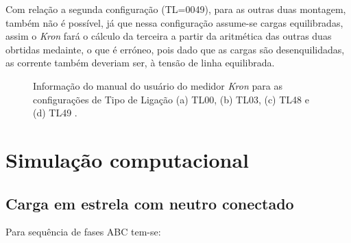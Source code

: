 \documentclass[a4paper,12pt,oneside,openany,table,xcdraw]{article}
\begin{document}
Com relação a segunda configuração (TL=0049), para as outras duas montagem, também não é possível, já que nessa configuração assume-se cargas equilibradas, assim o \emph{Kron} fará o cálculo da  terceira a partir da aritmética das outras duas obrtidas medainte, o que é erróneo, pois dado que as cargas são desenquilidadas, as corrente também deveriam ser, à tensão de linha equilibrada.  

\vspace{0.15cm}
\begin{figure}[H]
\centering
{}\hfill

\hfill


\caption{Informação do manual do usuário do medidor \emph{Kron} para as configurações de Tipo de Ligação (a) TL00, (b) TL03, (c) TL48 e (d) TL49 \cite{Kron}.}
\label{conf:kron}
\end{figure}
\vspace{0.2cm}


\newpage
\section{Simulação computacional} %
\subsection{Carga em estrela com neutro conectado}
Para sequência de fases ABC tem-se: 
\end{document}
